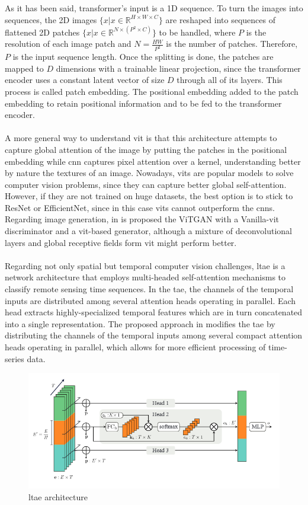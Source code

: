 \documentclass[../main.tex]{subfiles}
\begin{document}
As it has been said, transformer's input is a 1D sequence. To turn the images into sequences, the 2D images $\{x | x \in \mathbb{R} ^{H \times W \times C}\}$ are reshaped into sequences of flattened 2D patches $\{x | x \in \mathbb{R}^{N \times (P^2 \times C)}\}$ to be handled, where $P$ is the resolution of each image patch and $N = \frac{HW}{P^2} $ is the number of patches. Therefore, $P$ is the input sequence length.
Once the splitting is done, the patches are mapped to $D$ dimensions with a trainable linear projection, since the transformer encoder uses a constant latent vector of size $D$ through all of its layers. This process is called patch embedding. The positional embedding added to the patch embedding to retain positional information and to be fed to the transformer encoder.
\\\\
A more general way to understand \gls{vit} is that this architecture attempts to capture global attention of the image by putting the patches in the positional embedding while \gls{cnn} captures pixel attention over a kernel, understanding better by nature the textures of an image. Nowadays, \gls{vit}s are popular models to solve computer vision problems, since they can capture better global self-attention. However, if they are not trained on huge datasets, the best option is to stick to ResNet or EfficientNet, since in this case \gls{vit}s cannot outperform the \gls{cnn}s.
Regarding image generation, in is proposed the ViTGAN with a Vanilla-\gls{vit} discriminator and a \gls{vit}-based generator, although a mixture of deconvolutional layers and global receptive fields form \gls{vit} might perform better.
\\\\
Regarding not only spatial but temporal computer vision challenges, \gls{ltae} is a network architecture that employs multi-headed self-attention mechanisms to classify remote sensing time sequences. In the \gls{tae}, the channels of the temporal inputs are distributed among several attention heads operating in parallel. Each head extracts highly-specialized temporal features which are in turn concatenated into a single representation. The proposed approach in \cite{garnot2021lightweight} modifies the \gls{tae} by distributing the channels of the temporal inputs among several compact attention heads operating in parallel, which allows for more efficient processing of time-series data.
\begin{figure}[H]
	\centering
	\includegraphics[width=12cm]{imgs/relatedwork/ltae}
	\caption{\gls{ltae} architecture}
\end{figure}
\end{document}
